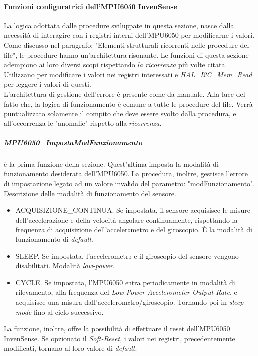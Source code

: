 \documentclass[11pt]{report}
\begin{document}
\paragraph{Funzioni configuratrici dell'MPU6050 InvenSense}
La logica adottata dalle procedure sviluppate in questa sezione, nasce dalla necessità di interagire con i registri interni dell'MPU6050 per modificarne i valori.\\
Come discusso nel paragrafo: "Elementi strutturali ricorrenti nelle procedure del file", le procedure hanno un'architettura risonante. Le funzioni di questa sezione adempiono ai loro diversi scopi rispettando \textit{la ricorrenza} più volte citata.
Utilizzano  per modificare i valori nei registri interessati e \textit{HAL\_I2C\_Mem\_Read} per leggere i valori di questi.\\
L'architettura di gestione dell'errore è presente come da manuale.
Alla luce del fatto che, la logica di funzionamento è comune a tutte le procedure del file. Verrà puntualizzato solamente il compito che deve essere svolto dalla procedura, e all'occorrenza le "anomalie" rispetto alla \textit{ricorrenza}.
\subparagraph{MPU6050\_ImpostaModFunzionamento}
è la prima funzione della sezione. Quest'ultima imposta la modalità di funzionamento desiderata dell'MPU6050. La procedura, inoltre, gestisce l'errore di impostazione legato ad un valore invalido del parametro: "modFunzionamento".\\
Descrizione delle modalità di funzionamento del sensore.
\begin{itemize}
    \item ACQUISIZIONE\_CONTINUA. Se impostata, il sensore acquisisce le misure dell'accelerazione e della velocità angolare continuamente, rispettando la frequenza di acquisizione dell'accelerometro e del giroscopio. È la modalità di funzionamento di \textit{default}.
    \item SLEEP. Se impostata, l'accelerometro e il giroscopio del sensore vengono disabilitati. Modalità \textit{low-power}.
    \item CYCLE. Se impostata, l'MPU6050 entra periodicamente in modalità di rilevamento, alla frequenza del \textit{Low Power Accelerometer Output Rate}, e acquisisce una misura dall'accelerometro/giroscopio. Tornando poi in \textit{sleep mode} fino al ciclo successivo.
\end{itemize}
La funzione, inoltre, offre la possibilità di effettuare il reset dell'MPU6050 InvenSense. Se opzionato il \textit{Soft-Reset}, i valori nei registri, precedentemente modificati, tornano al loro valore di \textit{default}.\\
\end{document}
